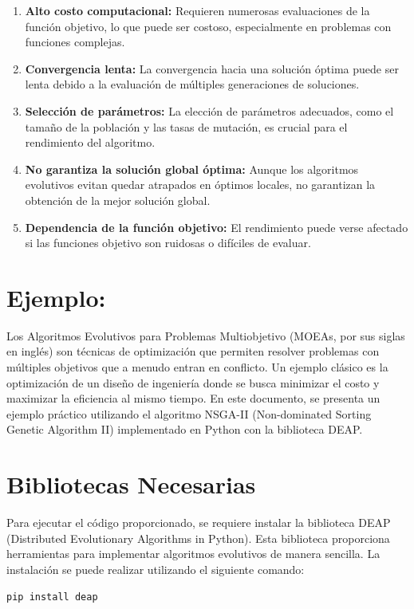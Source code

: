 \documentclass[12pt]{article}
\begin{document}
\begin{enumerate}
	\item \textbf{Alto costo computacional:} Requieren numerosas evaluaciones de la función objetivo, lo que puede ser costoso, especialmente en problemas con funciones complejas.
	\item \textbf{Convergencia lenta:} La convergencia hacia una solución óptima puede ser lenta debido a la evaluación de múltiples generaciones de soluciones.
	\item \textbf{Selección de parámetros:} La elección de parámetros adecuados, como el tamaño de la población y las tasas de mutación, es crucial para el rendimiento del algoritmo.
	\item \textbf{No garantiza la solución global óptima:} Aunque los algoritmos evolutivos evitan quedar atrapados en óptimos locales, no garantizan la obtención de la mejor solución global.
	\item \textbf{Dependencia de la función objetivo:} El rendimiento puede verse afectado si las funciones objetivo son ruidosas o difíciles de evaluar.
\end{enumerate}

\section*{Ejemplo:}
Los Algoritmos Evolutivos para Problemas Multiobjetivo (MOEAs, por sus siglas en inglés) son técnicas de optimización que permiten resolver problemas con múltiples objetivos que a menudo entran en conflicto. Un ejemplo clásico es la optimización de un diseño de ingeniería donde se busca minimizar el costo y maximizar la eficiencia al mismo tiempo. En este documento, se presenta un ejemplo práctico utilizando el algoritmo NSGA-II (Non-dominated Sorting Genetic Algorithm II) implementado en Python con la biblioteca DEAP.

\section*{Bibliotecas Necesarias}
Para ejecutar el código proporcionado, se requiere instalar la biblioteca DEAP (Distributed Evolutionary Algorithms in Python). Esta biblioteca proporciona herramientas para implementar algoritmos evolutivos de manera sencilla. La instalación se puede realizar utilizando el siguiente comando:

\begin{lstlisting}[language=bash]
	pip install deap
\end{lstlisting}
\end{document}
